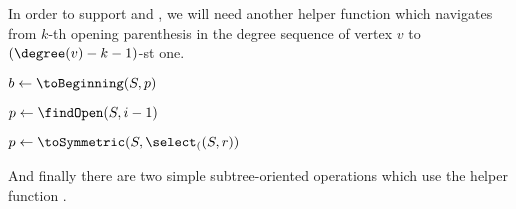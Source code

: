 \begin{algorithm}
\begin{algorithmic}
	\State {}
\EndFunction
\end{algorithmic}
\end{algorithm}

In order to support \dfudsRank{} and \dfudsSelect{}, we will need another helper function \toSymmetric{} which navigates from $k$-th opening parenthesis in the degree sequence of vertex $v$ to $(\degree(v) - k - 1)$-st one.

\begin{algorithm}
\begin{algorithmic}
	\State $b \gets \toBeginning(S, p)$
	\State {}
\EndFunction
\end{algorithmic}
\end{algorithm}

\begin{algorithm}
\begin{algorithmic}
		\State {}
	\Else
		\State $p \gets \findOpen(S, i - 1)$
		\State {}
	\EndIf
\EndFunction
\end{algorithmic}
\end{algorithm}

\begin{algorithm}
\begin{algorithmic}
		\State {}
	\Else
		\State $p \gets \toSymmetric(S, \select_((S, r))$
		\State {}
	\EndIf
\EndFunction
\end{algorithmic}
\end{algorithm}

And finally there are two simple subtree-oriented operations which use the helper function \toLast{}.

\begin{algorithm}
\begin{algorithmic}
		\State {}
	\Else
		\State {}
	\EndIf
\EndFunction
\end{algorithmic}
\end{algorithm}

\begin{algorithm}
\begin{algorithmic}
		\State {}
	\Else
		\State {}
	\EndIf
\EndFunction
\end{algorithmic}
\end{algorithm}

